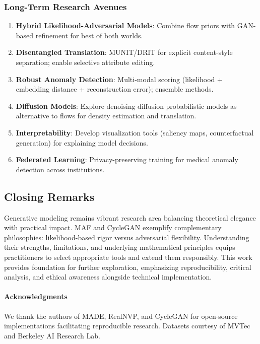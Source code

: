 \documentclass[11pt]{article}
\begin{document}
\subsubsection{Long-Term Research Avenues}
\begin{enumerate}
\item \textbf{Hybrid Likelihood-Adversarial Models}: Combine flow priors with GAN-based refinement for best of both worlds.
\item \textbf{Disentangled Translation}: MUNIT/DRIT for explicit content-style separation; enable selective attribute editing.
\item \textbf{Robust Anomaly Detection}: Multi-modal scoring (likelihood + embedding distance + reconstruction error); ensemble methods.
\item \textbf{Diffusion Models}: Explore denoising diffusion probabilistic models as alternative to flows for density estimation and translation.
\item \textbf{Interpretability}: Develop visualization tools (saliency maps, counterfactual generation) for explaining model decisions.
\item \textbf{Federated Learning}: Privacy-preserving training for medical anomaly detection across institutions.
\end{enumerate}

\subsection{Closing Remarks}
Generative modeling remains vibrant research area balancing theoretical elegance with practical impact. MAF and CycleGAN exemplify complementary philosophies: likelihood-based rigor versus adversarial flexibility. Understanding their strengths, limitations, and underlying mathematical principles equips practitioners to select appropriate tools and extend them responsibly. This work provides foundation for further exploration, emphasizing reproducibility, critical analysis, and ethical awareness alongside technical implementation.

\paragraph{Acknowledgments} We thank the authors of MADE, RealNVP, and CycleGAN for open-source implementations facilitating reproducible research. Datasets courtesy of MVTec and Berkeley AI Research Lab.
\end{document}

